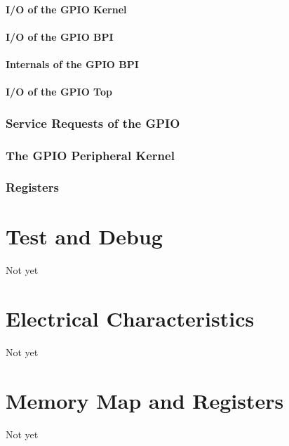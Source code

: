 \subsubsection{I/O of the GPIO Kernel}

\subsubsection{I/O of the GPIO BPI}

\subsubsection{Internals of the GPIO BPI}

\subsubsection{I/O of the GPIO Top}

\subsection{Service Requests of the GPIO}

\subsection{The GPIO Peripheral Kernel}
\label{subsec:gpiofunc02}

\subsection{Registers}


\chapter{Test and Debug}
Not yet

\chapter{Electrical Characteristics}
Not yet

\chapter{Memory Map and Registers}
Not yet


